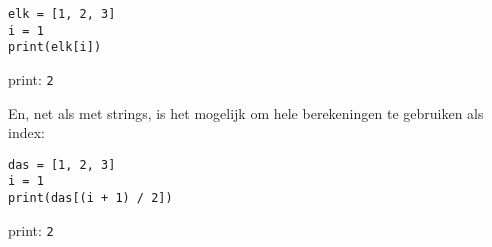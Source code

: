 \begin{minipage}{0.45\textwidth}
\begin{verbatim}
elk = [1, 2, 3]
i = 1
print(elk[i])
\end{verbatim}
\end{minipage}
\vline\hfill
\begin{minipage}{0.45\textwidth}
print: \texttt{2}
\end{minipage}

En, net als met strings, is het mogelijk om hele berekeningen te gebruiken als index:

\begin{minipage}{0.45\textwidth}
\begin{verbatim}
das = [1, 2, 3]
i = 1
print(das[(i + 1) / 2])
\end{verbatim}
\end{minipage}
\vline\hfill
\begin{minipage}{0.45\textwidth}
print: \texttt{2}
\end{minipage}
